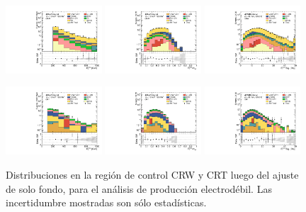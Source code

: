\begin{figure}[ht!]
  \begin{center}

    \includegraphics[width=0.32\textwidth]{images/analysis_EWK/v192_0_nosyst/can_CRW_met_et_afterFit.pdf}
    \includegraphics[width=0.32\textwidth]{images/analysis_EWK/v192_0_nosyst/can_CRW_met_etmeff_afterFit.pdf}
    \includegraphics[width=0.32\textwidth]{images/analysis_EWK/v192_0_nosyst/can_CRW_met_sig_obj_afterFit.pdf}

    \includegraphics[width=0.32\textwidth]{images/analysis_EWK/v192_0_nosyst/can_CRT_met_et_afterFit.pdf}
    \includegraphics[width=0.32\textwidth]{images/analysis_EWK/v192_0_nosyst/can_CRT_met_etmeff_afterFit.pdf}
    \includegraphics[width=0.32\textwidth]{images/analysis_EWK/v192_0_nosyst/can_CRT_met_sig_obj_afterFit.pdf}

    \caption{Distribuciones en la región de control CRW y CRT luego del ajuste de solo fondo, para el análisis de producción electrodébil. Las incertidumbre mostradas son sólo estadísticas.}
    \label{fig:crw_crt_dist_ewk}
  \end{center}
\end{figure}


